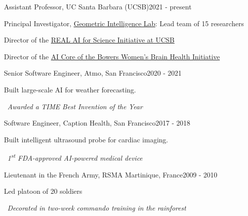 
\begin{joblong}{Assistant Professor, UC Santa Barbara (UCSB)}{2021 - present}
\item Principal Investigator, \href{https://gi.ece.ucsb.edu/}{Geometric Intelligence Lab}: Lead team of 15 researchers
\item Director of the \href{https://www.ai.ece.ucsb.edu/}{REAL AI for Science Initiative at UCSB}
\item Director of the \href{https://wbhi.ucsb.edu/}{AI Core of the Bowers Women's Brain Health Initiative}
\end{joblong}

\begin{joblong}{Senior Software Engineer, Atmo, San Francisco}{2020 - 2021}
\item Built large-scale AI for weather forecasting. 
\item {\small{\faAward}}~\textit{Awarded a TIME Best Invention of the Year}
\end{joblong}

\begin{joblong}{Software Engineer, Caption Health, San Francisco}{2017 - 2018}
\item Built  intelligent ultrasound probe for cardiac imaging. 
\item {\small{\faAward}}~\textit{1\textsuperscript{st} FDA-approved AI-powered medical device}
\end{joblong}

\begin{joblong}{Lieutenant in the French Army, RSMA Martinique, France}{2009 - 2010}
\item Led platoon of 20 soldiers
\item {\small{\faAward}}~\textit{Decorated in two-week commando training in the rainforest}
\end{joblong}
